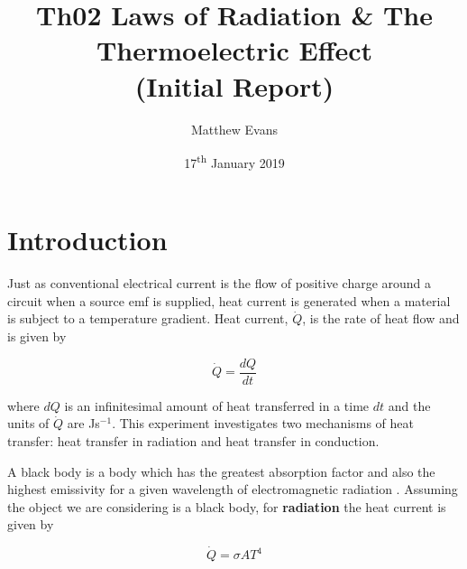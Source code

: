 \documentclass{article}
\begin{document}
\title{Th02 Laws of Radiation \& The Thermoelectric Effect \\ \large{(Initial Report)}} %
\author{Matthew Evans}%
\date{17\textsuperscript{th} January 2019} %
\maketitle %



\section{Introduction}
\label{sec:introduction}

Just as conventional electrical current is the flow of positive charge around a circuit when a source emf is supplied, heat current is generated when a material is subject to a temperature gradient. Heat current, $\dot{Q}$, is the rate of heat flow and is given by

\begin{equation}
\label{eq:Heat-Current}
\dot{Q} = \frac{dQ}{dt}
\end{equation}

\vspace{2mm}
\noindent
where $dQ$ is an infinitesimal amount of heat transferred in a time $dt$ and the units of $\dot{Q}$ are Js$^{-1}$. This experiment investigates two mechanisms of heat transfer: heat transfer in radiation and heat transfer in conduction.

\vspace{2mm}
\noindent
A black body is a body which has the greatest absorption factor and also the highest emissivity for a given wavelength of electromagnetic radiation \cite{Paper01}. %
Assuming the object we are considering is a black body, for \textbf{radiation} the heat current is given by

\begin{equation}
\label{eq:SB-Law}
\dot{Q} = \sigma AT^4
\end{equation}
\end{document}
